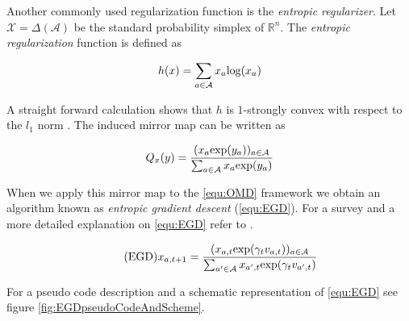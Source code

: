 Another commonly used regularization function is the \textit{entropic regularizer}. Let $\mathcal{X} = \Delta(\mathcal{A})$ be the standard probability simplex of $\mathbb{R}^n$. The \textit{entropic regularization} function is defined as

\begin{equation*}
    h(x) = \sum_{a\in\mathcal{A}}x_a\textnormal{log}(x_a)
\end{equation*}

A straight forward calculation shows that $h$ is $1$-strongly convex with respect to the $l_1$ norm \cite{HDRmertikopoulos}. The induced mirror map can be written as

\begin{equation*}
    Q_x(y) = \frac{(x_a\textnormal{exp}(y_a))_{a\in\mathcal{A}}}{\sum_{a\in\mathcal{A}}x_a\textnormal{exp}(y_a)}
\end{equation*}

When we apply this mirror map to the \ref{equ:OMD} framework we obtain an algorithm known as \textit{entropic gradient descent} (\ref{equ:EGD}). For a survey and a more detailed explanation on \ref{equ:EGD} refer to \cite{shalev}. 

\begin{equation}
    \tag{EGD}
    x_{a,t+1} = \frac{(x_{a,t}\textnormal{exp}(\gamma_t v_{a,t}))_{a\in\mathcal{A}}}{\sum_{a'\in\mathcal{A}}x_{a',t}\textnormal{exp}(\gamma_t v_{a',t})}
    \label{equ:EGD}
\end{equation}

For a pseudo code description and a schematic representation of \ref{equ:EGD} see figure \ref{fig:EGDpseudoCodeAndScheme}.

